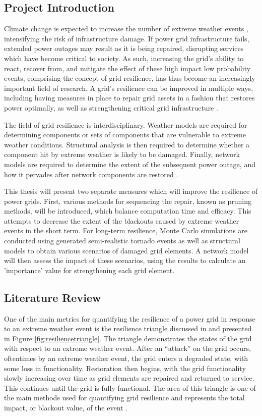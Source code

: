 \documentclass[12pt]{article}
\begin{document}
\subsection{Project Introduction}
Climate change is expected to increase the number of extreme weather events \cite{cheng}, intensifying the risk of infrastructure damage. If power grid infrastructure fails, extended power outages may result as it is being repaired, disrupting services which have become critical to society. As such, increasing the grid’s ability to react, recover from, and mitigate the effect of these high impact low probability events, comprising the concept of grid resilience, has thus become an increasingly important field of research. A grid’s resilience can be improved in multiple ways, including having measures in place to repair grid assets in a fashion that restores power optimally, as well as strengthening critical grid infrastructure \cite{panteli}. \par
The field of grid resilience is interdisciplinary. Weather models are required for determining components or sets of components that are vulnerable to extreme weather conditions. Structural analysis is then required to determine whether a component hit by extreme weather is likely to be damaged. Finally, network models are required to determine the extent of the subsequent power outage, and how it pervades after network components are restored \cite{panteli}. \par
This thesis will present two separate measures which will improve the resilience of power grids. First, various methods for sequencing the repair, known as pruning methods, will be introduced, which balance computation time and efficacy. This attempts to decrease the extent of the blackouts caused by extreme weather events in the short term. For long-term resilience, Monte Carlo simulations are conducted using generated semi-realistic tornado events as well as structural models to obtain various scenarios of damaged grid elements. A network model will then assess the impact of these scenarios, using the results to calculate an 'importance' value for strengthening each grid element.
\subsection{Literature Review} \label{LitReview}
One of the main metrics for quantifying the resilience of a power grid in response to an extreme weather event is the resilience triangle discussed in \cite{Jufri} and presented in Figure \ref{fig:resiliencetriangle}. The triangle demonstrates the states of the grid with respect to an extreme weather event. After an “attack” on the grid occurs, oftentimes by an extreme weather event, the grid enters a degraded state, with some loss in functionality.  Restoration then begins, with the grid functionality slowly increasing over time as grid elements are repaired and returned to service. This continues until the grid is fully functional. The area of this triangle is one of the main methods used for quantifying grid resilience and represents the total impact, or blackout value, of the event \cite{Jufri}.  \par
\end{document}
